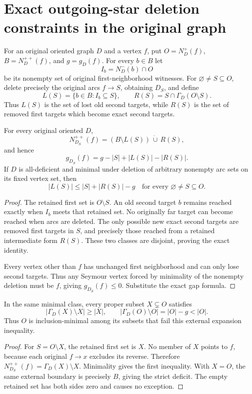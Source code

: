 \section{Exact outgoing-star deletion constraints in the original graph}
\label{sec:outstar-deletion-criticality}

For an original oriented graph $D$ and a vertex $f$, put
$O=N_D^+(f)$, $B=N_D^{++}(f)$, and $g=g_D(f)$.
For every $b\in B$ let
\[
 I_b=N_D^-(b)\cap O
\]
be its nonempty set of original first-neighborhood witnesses.
For $\varnothing\ne S\subseteq O$, delete precisely the original
arcs $f\to S$, obtaining $D_S$, and define
\[
 L(S)=\{b\in B:I_b\subseteq S\},\qquad
 R(S)=S\cap\Gamma_D(O\setminus S).
\]
Thus $L(S)$ is the set of lost old second targets, while $R(S)$ is
the set of removed first targets which become exact second targets.

\begin{lemma}
\label{lem:outstar-exact-loss-retargeting}
For every original oriented $D$,
\[
 N_{D_S}^{++}(f)=(B\setminus L(S))\,\dot\cup\,R(S),
\]
and hence
\[
 g_{D_S}(f)=g-|S|+|L(S)|-|R(S)|.
\]
If $D$ is all-deficient and minimal under deletion of arbitrary
nonempty arc sets on its fixed vertex set, then
\[
 |L(S)|\le |S|+|R(S)|-g
 \quad\text{for every }\varnothing\ne S\subseteq O.
 \tag{OD1}\label{eq:outstar-minimal-budget}
\]
\end{lemma}
\begin{proof}
The retained first set is $O\setminus S$. An old second target
$b$ remains reached exactly when $I_b$ meets that retained set.
No originally far target can become reached when arcs are deleted.
The only possible new exact second targets are removed first targets
in $S$, and precisely those reached from a retained intermediate form
$R(S)$. These two classes are disjoint, proving the exact identity.

Every vertex other than $f$ has unchanged first neighborhood and can
only lose second targets. Thus any Seymour vertex forced by minimality
of the nonempty deletion must be $f$, giving $g_{D_S}(f)\le0$.
Substitute the exact gap formula.
\end{proof}

\begin{corollary}
\label{cor:outstar-proper-retained-expansion}
In the same minimal class, every proper subset $X\subsetneq O$ satisfies
\[
 |\Gamma_D(X)\setminus X|\ge|X|,
 \qquad |\Gamma_D(O)\setminus O|=|O|-g<|O|.
\]
Thus $O$ is inclusion-minimal among its subsets that fail this
external expansion inequality.
\end{corollary}
\begin{proof}
For $S=O\setminus X$, the retained first set is $X$. No member of $X$
points to $f$, because each original $f\to x$ excludes its reverse.
Therefore $N_{D_S}^{++}(f)=\Gamma_D(X)\setminus X$.
Minimality gives the first inequality. With $X=O$, the same external
boundary is precisely $B$, giving the strict deficit. The empty
retained set has both sides zero and causes no exception.
\end{proof}

